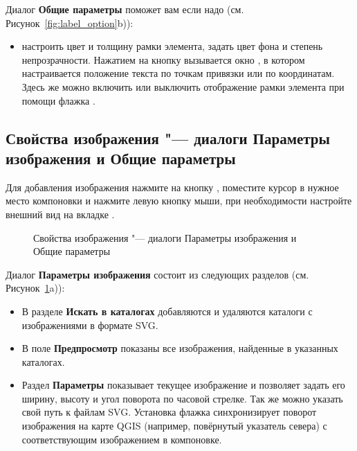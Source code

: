 
Диалог \textbf{Общие параметры} поможет вам если надо
(см. Рисунок~\ref{fig:label_option}b)):

\begin{itemize}[label=--]
\item настроить цвет и толщину рамки элемента, задать
цвет фона и степень непрозрачности. Нажатием на кнопку 
вызывается окно , в котором настраивается
положение текста по точкам привязки или по координатам. Здесь же можно
включить или выключить отображение рамки элемента при помощи флажка
.
\end{itemize}

\subsection{Свойства изображения "--- диалоги Параметры изображения и Общие параметры}

Для добавления изображения нажмите на кнопку
, поместите
курсор в нужное место компоновки и нажмите левую кнопку мыши, при
необходимости настройте внешний вид на вкладке .

\begin{figure}[ht]
\centering
     \hspace{1cm}
   \caption{Свойства изображения "--- диалоги Параметры изображения и Общие параметры \wincaption}\label{fig:imageoptions}
\end{figure}


Диалог \textbf{Параметры изображения} состоит из следующих
разделов (см. Рисунок~\ref{fig:imageoptions}a)):

\begin{itemize}[label=--]
\item В разделе \textbf{Искать в каталогах} добавляются и удаляются
каталоги с изображениями в формате SVG.
\item В поле \textbf{Предпросмотр} показаны все изображения, найденные
в указанных каталогах.
\item Раздел \textbf{Параметры} показывает текущее изображение и
позволяет задать его ширину, высоту и угол поворота по часовой стрелке.
Так же можно указать свой путь к файлам SVG. Установка флажка
 синхронизирует поворот изображения
на карте QGIS (например, повёрнутый указатель севера) с соответствующим
изображением в компоновке.
\end{itemize}

